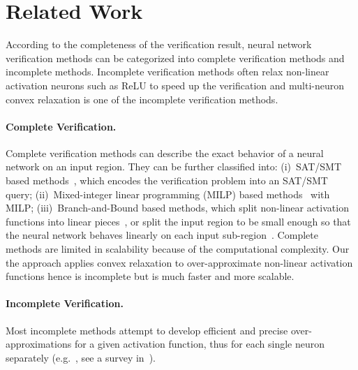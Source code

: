\documentclass[runningheads]{llncs}
\begin{document}
%
%
%

\section{Related Work}\label{related work}

According to the completeness of the verification result, neural network verification
methods can be categorized into complete verification methods and incomplete methods.
Incomplete verification methods often relax non-linear activation neurons such as
ReLU to speed up the verification and
multi-neuron convex relaxation is one of the incomplete verification methods.

\paragraph{Complete Verification.}
Complete verification methods can describe the exact behavior
of a neural network on an input region. They can be further
classified into: (i)~SAT/SMT based
methods~\cite{DBLP:conf/cav/KatzBDJK17,DBLP:conf/cav/KatzHIJLLSTWZDK19,DBLP:conf/atva/Ehlers17},
which encodes the verification problem into an SAT/SMT query;
(ii)~Mixed-integer linear programming (MILP) based
methods~\cite{DBLP:conf/atva/Ehlers17,DBLP:journals/mp/AndersonHMTV20,DBLP:conf/aaai/BotoevaKKLM20} with MILP;
(iii)~Branch-and-Bound based methods, which split non-linear
activation functions into linear
pieces~\cite{DBLP:conf/iclr/XuZ0WJLH21,DBLP:conf/nips/WangPWYJ18,DBLP:journals/jmlr/BunelLTTKK20,NEURIPS2021_fac7fead},
or split the input region to be small enough so that the neural
network behaves linearly on each input
sub-region~\cite{DBLP:conf/uss/WangPWYJ18}. Complete methods are
limited in scalability because of the computational complexity. Our
the approach applies convex relaxation to over-approximate non-linear
activation functions hence is incomplete but is much faster and more
scalable.

\paragraph{Incomplete Verification.}
Most incomplete methods attempt to develop efficient and precise
over-approximations for a given activation function, thus for each
single neuron separately
(e.g.~\cite{NEURIPS2018_f2f44698,DBLP:journals/pacmpl/SinghGPV19,DBLP:conf/nips/ZhangWCHD18,DBLP:conf/nips/SalmanY0HZ19,DBLP:conf/iclr/XuZ0WJLH21,Zheng2022},
see a survey in~\cite{DBLP:journals/ftopt/LiuALSBK21}).  
\end{document}
